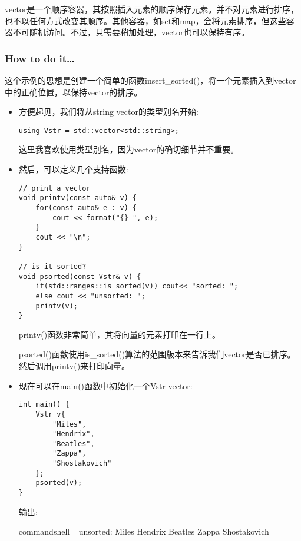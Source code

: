 
vector是一个顺序容器，其按照插入元素的顺序保存元素。并不对元素进行排序，也不以任何方式改变其顺序。其他容器，如set和map，会将元素排序，但这些容器不可随机访问。不过，只需要稍加处理，vector也可以保持有序。

\subsubsection{How to do it…}

这个示例的思想是创建一个简单的函数insert\_sorted()，将一个元素插入到vector中的正确位置，以保持vector的排序。

\begin{itemize}
\item 
方便起见，我们将从string vector的类型别名开始:

\begin{lstlisting}[style=styleCXX]
using Vstr = std::vector<std::string>;
\end{lstlisting}

这里我喜欢使用类型别名，因为vector的确切细节并不重要。

\item 
然后，可以定义几个支持函数:

\begin{lstlisting}[style=styleCXX]
// print a vector
void printv(const auto& v) {
	for(const auto& e : v) {
		cout << format("{} ", e);
	}
	cout << "\n";
}

// is it sorted?
void psorted(const Vstr& v) {
	if(std::ranges::is_sorted(v)) cout<< "sorted: ";
	else cout << "unsorted: ";
	printv(v);
}
\end{lstlisting}

printv()函数非常简单，其将向量的元素打印在一行上。

psorted()函数使用is\_sorted()算法的范围版本来告诉我们vector是否已排序。然后调用printv()来打印向量。

\item 
现在可以在main()函数中初始化一个Vstr vector:

\begin{lstlisting}[style=styleCXX]
int main() {
	Vstr v{
		"Miles",
		"Hendrix",
		"Beatles",
		"Zappa",
		"Shostakovich"
	};
	psorted(v);
}
\end{lstlisting}

输出:

\begin{tcblisting}{commandshell={}}
unsorted: Miles Hendrix Beatles Zappa Shostakovich
\end{tcblisting}


\end{itemize}
